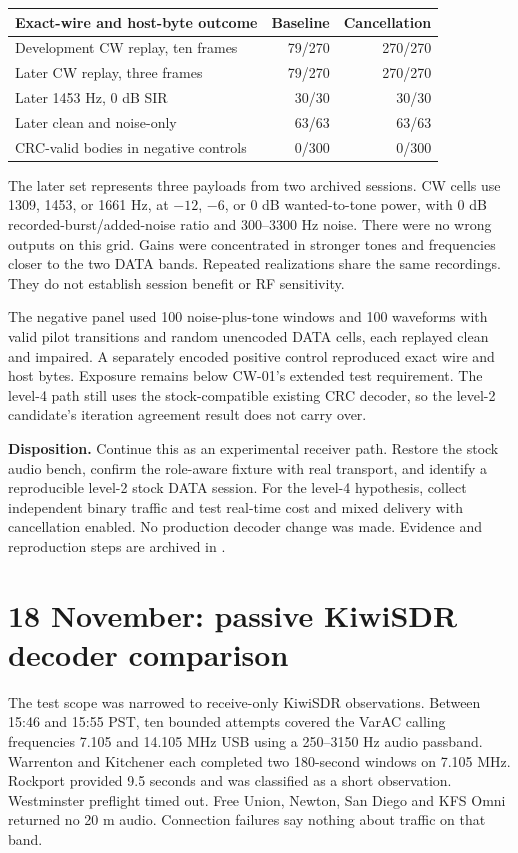 \documentclass[11pt,a4paper]{article}
\newcommand{\pathtext}[1]{\path{#1}}
\begin{document}
\begin{center}
\begin{tabular}{lrr}
\toprule
Exact-wire and host-byte outcome & Baseline & Cancellation \\
\midrule
Development CW replay, ten frames & 79/270 & 270/270 \\
Later CW replay, three frames & 79/270 & 270/270 \\
Later 1453 Hz, 0 dB SIR & 30/30 & 30/30 \\
Later clean and noise-only & 63/63 & 63/63 \\
CRC-valid bodies in negative controls & 0/300 & 0/300 \\
\bottomrule
\end{tabular}
\end{center}
The later set represents three payloads from two archived sessions. CW cells
use 1309, 1453, or 1661 Hz, at $-12$, $-6$, or 0 dB wanted-to-tone power, with
0 dB recorded-burst/added-noise ratio and 300--3300 Hz noise. There were no
wrong outputs on this grid. Gains were concentrated in stronger tones and
frequencies closer to the two DATA bands. Repeated realizations share the
same recordings. They do not establish session benefit or RF sensitivity.

The negative panel used 100 noise-plus-tone windows and 100 waveforms with
valid pilot transitions and random unencoded DATA cells, each replayed clean
and impaired. A separately encoded positive control reproduced exact wire and
host bytes. Exposure remains below CW-01's extended test requirement. The
level-4 path still uses the stock-compatible existing CRC decoder, so the
level-2 candidate's iteration agreement result does not carry over.

\textbf{Disposition.} Continue this as an experimental receiver path. Restore
the stock audio bench, confirm the role-aware fixture with real transport, and
identify a reproducible level-2 stock DATA session. For the level-4 hypothesis,
collect independent binary traffic and test real-time cost and mixed delivery
with cancellation enabled. No production decoder change was made.
Evidence and reproduction steps are archived in
\pathtext{tools/soft-metric-study/results/cw-level4-2026-11-18/}.

\clearpage
\section{18 November: passive KiwiSDR decoder comparison}
\label{sec:kiwisdr-passive-comparison}
The test scope was narrowed to receive-only KiwiSDR observations. Between
15:46 and 15:55 PST, ten bounded attempts covered the VarAC calling frequencies
7.105 and 14.105 MHz USB using a 250--3150 Hz audio passband. Warrenton and
Kitchener each completed two 180-second windows on 7.105 MHz. Rockport
provided 9.5 seconds and was classified as a short observation. Westminster
preflight timed out. Free Union, Newton, San Diego and KFS Omni returned no
20 m audio. Connection failures say nothing about traffic on that band.
\end{document}
